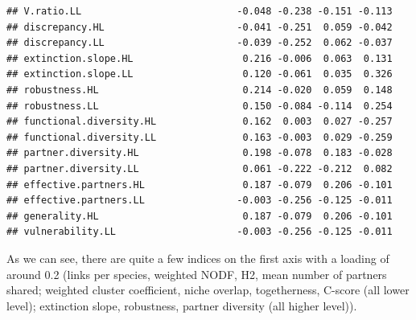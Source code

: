 \documentclass[a4paper, 11pt]{article}\usepackage[]{graphicx}\usepackage[dvipsnames]{xcolor}
\makeatletter
\newenvironment{kframe}{%
 \def\at@end@of@kframe{}%
 \ifinner\ifhmode%
  \def\at@end@of@kframe{\end{minipage}}%
  \begin{minipage}{\columnwidth}%
 \fi\fi%
 \def\FrameCommand##1{\hskip\@totalleftmargin \hskip-\fboxsep
 \colorbox{shadecolor}{##1}\hskip-\fboxsep
     \hskip-\linewidth \hskip-\@totalleftmargin \hskip\columnwidth}%
 \MakeFramed {\advance\hsize-\width
   \@totalleftmargin\z@ \linewidth\hsize
   \@setminipage}}%
 {\par\unskip\endMakeFramed%
 \at@end@of@kframe}
\newenvironment{knitrout}{}{} %
\makeatother
\begin{document}
\begin{knitrout}
\begin{kframe}
\begin{verbatim}
## V.ratio.LL                           -0.048 -0.238 -0.151 -0.113
## discrepancy.HL                       -0.041 -0.251  0.059 -0.042
## discrepancy.LL                       -0.039 -0.252  0.062 -0.037
## extinction.slope.HL                   0.216 -0.006  0.063  0.131
## extinction.slope.LL                   0.120 -0.061  0.035  0.326
## robustness.HL                         0.214 -0.020  0.059  0.148
## robustness.LL                         0.150 -0.084 -0.114  0.254
## functional.diversity.HL               0.162  0.003  0.027 -0.257
## functional.diversity.LL               0.163 -0.003  0.029 -0.259
## partner.diversity.HL                  0.198 -0.078  0.183 -0.028
## partner.diversity.LL                  0.061 -0.222 -0.212  0.082
## effective.partners.HL                 0.187 -0.079  0.206 -0.101
## effective.partners.LL                -0.003 -0.256 -0.125 -0.011
## generality.HL                         0.187 -0.079  0.206 -0.101
## vulnerability.LL                     -0.003 -0.256 -0.125 -0.011
\end{verbatim}
\end{kframe}
\end{knitrout}
As we can see, there are quite a few indices on the first axis with a loading of around 0.2 (links per species, weighted NODF, H2, mean number of partners shared; weighted cluster coefficient, niche overlap, togetherness, C-score (all lower level); extinction slope, robustness, partner diversity (all higher level)). 
\end{document}
